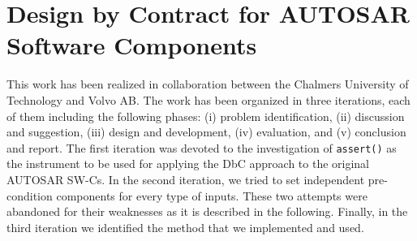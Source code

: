 \section{Design by Contract for AUTOSAR Software Components}\label{sec:approach}

%
%

This work has been realized in collaboration between the Chalmers University of Technology and Volvo AB. The work has been organized in three iterations, each of them including the following phases: (i) problem identification, (ii) discussion and suggestion, (iii) design and development, (iv) evaluation, and (v) conclusion and report. 
The first iteration was devoted to the investigation of \texttt{assert()} %
as the instrument to be used for applying the DbC approach to the original AUTOSAR SW-Cs. In the second iteration, we tried to set independent pre-condition components for every type of inputs. These two attempts were abandoned for their weaknesses as it is described in the following. Finally, in the third iteration we identified the method that we implemented and used. %


